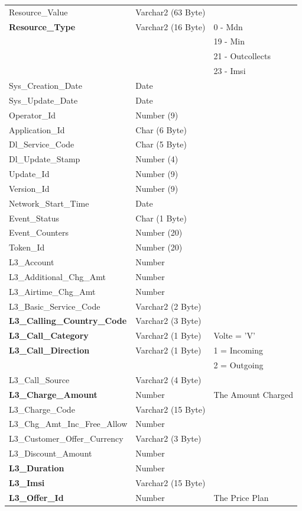 \documentclass[12pt,twoside]{article}
\begin{document}
\begin{longtable}{l|l|l}
Resource\_Value & Varchar2 (63 Byte) & \\
\textbf{Resource\_Type} & Varchar2 (16 Byte) & 0 - Mdn\\
 &  & 19 - Min\\
 &  & 21 - Outcollects\\
 &  & 23 - Imsi\\
Sys\_Creation\_Date & Date & \\
Sys\_Update\_Date & Date & \\
Operator\_Id & Number (9) & \\
Application\_Id & Char (6 Byte) & \\
Dl\_Service\_Code & Char (5 Byte) & \\
Dl\_Update\_Stamp & Number (4) & \\
Update\_Id & Number (9) & \\
Version\_Id & Number (9) & \\
Network\_Start\_Time & Date & \\
Event\_Status & Char (1 Byte) & \\
Event\_Counters & Number (20) & \\
Token\_Id & Number (20) & \\
L3\_Account & Number & \\
L3\_Additional\_Chg\_Amt & Number & \\
L3\_Airtime\_Chg\_Amt & Number & \\
L3\_Basic\_Service\_Code & Varchar2 (2 Byte) & \\
\textbf{L3\_Calling\_Country\_Code} & Varchar2 (3 Byte) & \\
\textbf{L3\_Call\_Category} & Varchar2 (1 Byte) & Volte = 'V'\\
\textbf{L3\_Call\_Direction} & Varchar2 (1 Byte) & 1 = Incoming\\
 &  & 2 = Outgoing\\
L3\_Call\_Source & Varchar2 (4 Byte) & \\
\textbf{L3\_Charge\_Amount} & Number & The Amount Charged\\
L3\_Charge\_Code & Varchar2 (15 Byte) & \\
L3\_Chg\_Amt\_Inc\_Free\_Allow & Number & \\
L3\_Customer\_Offer\_Currency & Varchar2 (3 Byte) & \\
L3\_Discount\_Amount & Number & \\
\textbf{L3\_Duration} & Number & \\
\textbf{L3\_Imsi} & Varchar2 (15 Byte) & \\
\textbf{L3\_Offer\_Id} & Number & The Price Plan\\

\end{longtable}
\end{document}
